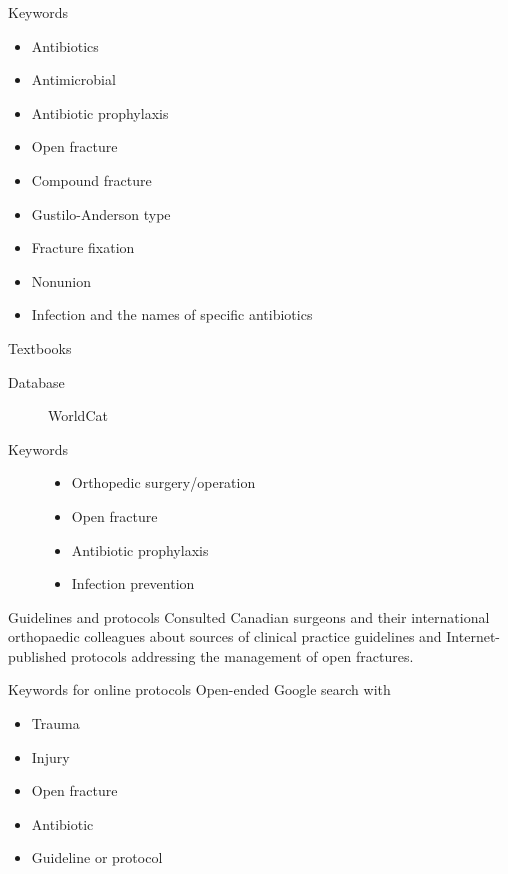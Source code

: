 \documentclass{beamer}
\begin{document}
\begin{frame}{Keywords}
    \begin{itemize}
        \item Antibiotics
        \item Antimicrobial
        \item Antibiotic prophylaxis
        \item Open fracture
        \item Compound fracture
        \item Gustilo-Anderson type
        \item Fracture fixation
        \item Nonunion
        \item Infection and the names of specific antibiotics
    \end{itemize}
\end{frame}

\begin{frame}{Textbooks}
    \begin{description}
        \item[Database] WorldCat
        \item[Keywords]
            \begin{itemize}
                \item Orthopedic surgery/operation
                \item Open fracture
                \item Antibiotic prophylaxis
                \item Infection prevention
            \end{itemize}
    \end{description}
\end{frame}

\begin{frame}{Guidelines and protocols}
    Consulted Canadian surgeons and their international orthopaedic colleagues
    about sources of clinical practice guidelines and Internet-published
    protocols addressing the management of open fractures.
\end{frame}

\begin{frame}{Keywords for online protocols}
    Open-ended Google search with
    \begin{itemize}
        \item Trauma
        \item Injury
        \item Open fracture
        \item Antibiotic
        \item Guideline or protocol
    \end{itemize}
\end{frame}
\end{document}
